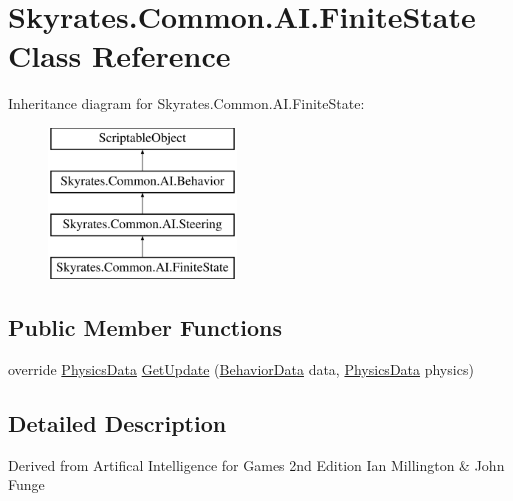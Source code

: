 \hypertarget{class_skyrates_1_1_common_1_1_a_i_1_1_finite_state}{\section{Skyrates.\-Common.\-A\-I.\-Finite\-State Class Reference}
\label{class_skyrates_1_1_common_1_1_a_i_1_1_finite_state}
}


 


Inheritance diagram for Skyrates.\-Common.\-A\-I.\-Finite\-State\-:\begin{figure}[H]
\begin{center}
\leavevmode
\includegraphics[height=4.000000cm]{class_skyrates_1_1_common_1_1_a_i_1_1_finite_state}
\end{center}
\end{figure}
\subsection*{Public Member Functions}
\begin{DoxyCompactItemize}
\item 
override \hyperlink{class_skyrates_1_1_common_1_1_a_i_1_1_physics_data}{Physics\-Data} \hyperlink{class_skyrates_1_1_common_1_1_a_i_1_1_finite_state_aec2f3b674a34badbea7421f26fc72b9f}{Get\-Update} (\hyperlink{class_skyrates_1_1_common_1_1_a_i_1_1_behavior_data}{Behavior\-Data} data, \hyperlink{class_skyrates_1_1_common_1_1_a_i_1_1_physics_data}{Physics\-Data} physics)
\end{DoxyCompactItemize}


\subsection{Detailed Description}


Derived from Artifical Intelligence for Games 2nd Edition Ian Millington \& John Funge 


